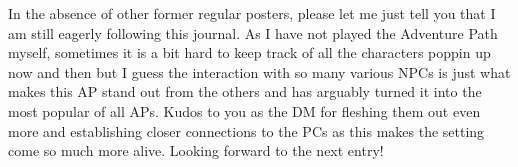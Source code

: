 In the absence of other former regular posters, please let me just tell you that I am still eagerly following this journal. As I have not played the Adventure Path myself, sometimes it is a bit hard to keep track of all the characters poppin up now and then but I guess the interaction with so many various NPCs is just what makes this AP stand out from the others and has arguably turned it into the most popular of all APs. Kudos to you as the DM for fleshing them out even more and establishing closer connections to the PCs as this makes the setting come so much more alive. Looking forward to the next entry!\\

